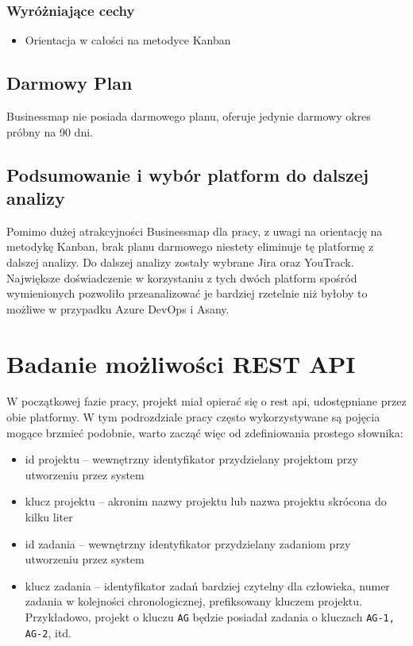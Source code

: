 \subsubsection*{Wyróżniające cechy}
\begin{itemize}
    \item Orientacja w całości na metodyce Kanban
\end{itemize}
\subsection*{Darmowy Plan}
Businessmap nie posiada darmowego planu, oferuje jedynie darmowy okres próbny na 90 dni.

\subsection*{Podsumowanie i wybór platform do dalszej analizy}
Pomimo dużej atrakcyjności Businessmap dla pracy, z uwagi na orientację na metodykę Kanban, brak planu darmowego niestety eliminuje tę platformę z dalszej analizy.
Do dalszej analizy zostały wybrane Jira oraz YouTrack. Największe doświadczenie w korzystaniu z tych dwóch platform spośród wymienionych pozwoliło przeanalizować je bardziej rzetelnie
niż byłoby to możliwe w przypadku Azure DevOps i Asany.

\section{Badanie możliwości REST API}
W początkowej fazie pracy, projekt miał opierać się o rest api, udostępniane przez obie platformy. \cite{JiraApiDocumentation} \cite{YouTrackApiDocumentation}
W tym podrozdziale pracy często wykorzystywane są pojęcia mogące brzmieć podobnie, warto zacząć więc od zdefiniowania prostego słownika:
\begin{itemize}
    \item id projektu -- wewnętrzny identyfikator przydzielany projektom przy utworzeniu przez system
    \item klucz projektu -- akronim nazwy projektu lub nazwa projektu skrócona do kilku liter
    \item id zadania -- wewnętrzny identyfikator przydzielany zadaniom przy utworzeniu przez system
    \item klucz zadania -- identyfikator zadań bardziej czytelny dla człowieka, numer zadania w kolejności chronologicznej, prefiksowany kluczem projektu.
    Przykładowo, projekt o kluczu \texttt{AG} będzie posiadał zadania o kluczach \texttt{AG-1, AG-2}, itd.
\end{itemize}

